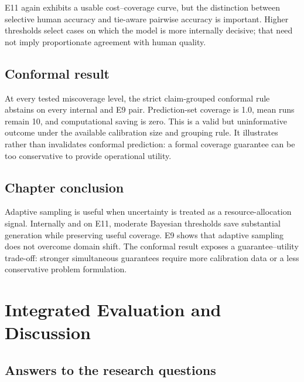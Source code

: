 \documentclass[11pt,twoside,a4paper]{report}
\begin{document}
E11 again exhibits a usable cost--coverage curve, but the distinction between
selective human accuracy and tie-aware pairwise accuracy is important.  Higher
thresholds select cases on which the model is more internally decisive; that need not
imply proportionate agreement with human quality.

\section{Conformal result}

At every tested miscoverage level, the strict claim-grouped conformal rule abstains
on every internal and E9 pair.  Prediction-set coverage is 1.0, mean runs remain 10,
and computational saving is zero.  This is a valid but uninformative outcome under
the available calibration size and grouping rule.  It illustrates rather than
invalidates conformal prediction: a formal coverage guarantee can be too conservative
to provide operational utility.

\section{Chapter conclusion}

Adaptive sampling is useful when uncertainty is treated as a resource-allocation
signal.  Internally and on E11, moderate Bayesian thresholds save substantial
generation while preserving useful coverage.  E9 shows that adaptive sampling does
not overcome domain shift.  The conformal result exposes a guarantee--utility
trade-off: stronger simultaneous guarantees require more calibration data or a less
conservative problem formulation.

\chapter{Integrated Evaluation and Discussion}
\label{chap:evaluation}

\section{Answers to the research questions}
\end{document}
